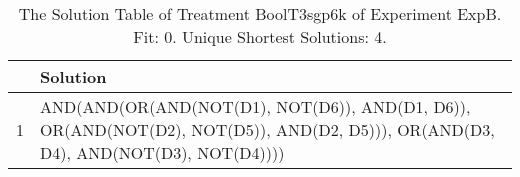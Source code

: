 \begin{table}[ht]
\centering
\begin{tabular}{rp{9cm}}
  \hline
 & Solution \\ 
  \hline
1 & AND(AND(OR(AND(NOT(D1), NOT(D6)), AND(D1, D6)), OR(AND(NOT(D2), NOT(D5)), AND(D2, D5))), OR(AND(D3, D4), AND(NOT(D3), NOT(D4)))) \\ 
   \hline
\end{tabular}
\caption{The Solution Table of Treatment BoolT3sgp6k of Experiment ExpB. Fit: 0. Unique Shortest Solutions: 4.} 
\end{table}
